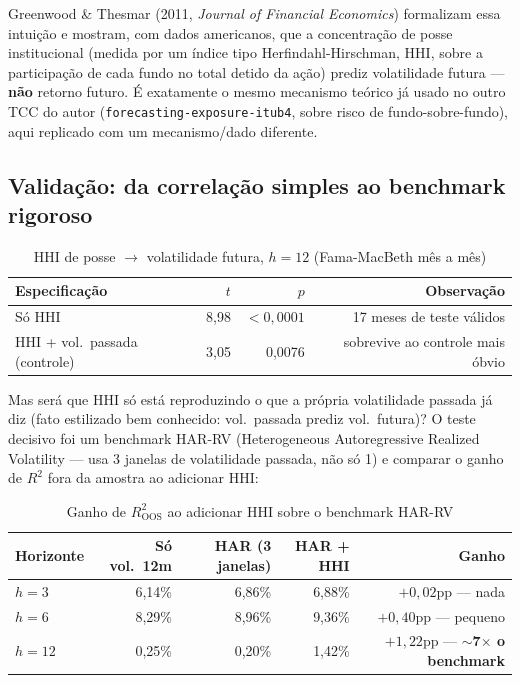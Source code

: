 \documentclass[11pt,a4paper]{article}
\begin{document}
Greenwood \& Thesmar (2011, \emph{Journal of Financial Economics}) formalizam
essa intuição e mostram, com dados americanos, que a concentração de posse
institucional (medida por um índice tipo Herfindahl-Hirschman, HHI, sobre
a participação de cada fundo no total detido da ação) prediz volatilidade
futura --- \textbf{não} retorno futuro. É exatamente o mesmo mecanismo
teórico já usado no outro TCC do autor (\texttt{forecasting-exposure-itub4},
sobre risco de fundo-sobre-fundo), aqui replicado com um mecanismo/dado
diferente.

\subsection{Validação: da correlação simples ao benchmark rigoroso}

\begin{table}[H]\centering\small
\caption{HHI de posse $\to$ volatilidade futura, $h=12$ (Fama-MacBeth mês a mês)}
\begin{tabular}{@{}lrrr@{}}
\toprule
Especificação & $t$ & $p$ & Observação \\
\midrule
Só HHI & 8,98 & $<0{,}0001$ & 17 meses de teste válidos \\
HHI + vol.\ passada (controle) & 3,05 & 0,0076 & sobrevive ao controle mais óbvio \\
\bottomrule
\end{tabular}
\end{table}

Mas será que HHI só está reproduzindo o que a própria volatilidade passada
já diz (fato estilizado bem conhecido: vol.\ passada prediz vol.\ futura)?
O teste decisivo foi um benchmark HAR-RV (Heterogeneous Autoregressive
Realized Volatility --- usa 3 janelas de volatilidade passada, não só 1) e
comparar o ganho de $R^2$ fora da amostra ao adicionar HHI:

\begin{table}[H]\centering\small
\caption{Ganho de $R^2_{\text{OOS}}$ ao adicionar HHI sobre o benchmark HAR-RV}
\begin{tabular}{@{}lrrrr@{}}
\toprule
Horizonte & Só vol.\ 12m & HAR (3 janelas) & HAR + HHI & Ganho \\
\midrule
$h=3$  & 6,14\% & 6,86\% & 6,88\% & $+0{,}02$pp --- nada \\
$h=6$  & 8,29\% & 8,96\% & 9,36\% & $+0{,}40$pp --- pequeno \\
$h=12$ & 0,25\% & 0,20\% & 1,42\% & $+1{,}22$pp --- \textbf{$\sim$7$\times$ o benchmark} \\
\bottomrule
\end{tabular}
\end{table}
\end{document}
